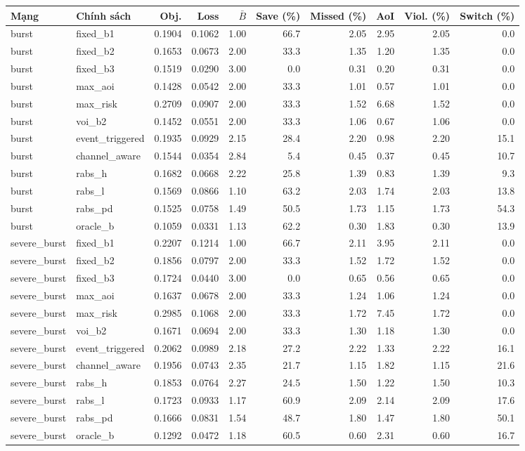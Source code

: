 \begin{tabular}{llrrrrrrrr}
\toprule
Mạng & Chính sách & Obj. & Loss & $\bar{B}$ & Save (\%) & Missed (\%) & AoI & Viol. (\%) & Switch (\%) \\
\midrule
burst & fixed\_b1 & 0.1904 & 0.1062 & 1.00 & 66.7 & 2.05 & 2.95 & 2.05 & 0.0 \\
burst & fixed\_b2 & 0.1653 & 0.0673 & 2.00 & 33.3 & 1.35 & 1.20 & 1.35 & 0.0 \\
burst & fixed\_b3 & 0.1519 & 0.0290 & 3.00 & 0.0 & 0.31 & 0.20 & 0.31 & 0.0 \\
burst & max\_aoi & 0.1428 & 0.0542 & 2.00 & 33.3 & 1.01 & 0.57 & 1.01 & 0.0 \\
burst & max\_risk & 0.2709 & 0.0907 & 2.00 & 33.3 & 1.52 & 6.68 & 1.52 & 0.0 \\
burst & voi\_b2 & 0.1452 & 0.0551 & 2.00 & 33.3 & 1.06 & 0.67 & 1.06 & 0.0 \\
burst & event\_triggered & 0.1935 & 0.0929 & 2.15 & 28.4 & 2.20 & 0.98 & 2.20 & 15.1 \\
burst & channel\_aware & 0.1544 & 0.0354 & 2.84 & 5.4 & 0.45 & 0.37 & 0.45 & 10.7 \\
burst & rabs\_h & 0.1682 & 0.0668 & 2.22 & 25.8 & 1.39 & 0.83 & 1.39 & 9.3 \\
burst & rabs\_l & 0.1569 & 0.0866 & 1.10 & 63.2 & 2.03 & 1.74 & 2.03 & 13.8 \\
burst & rabs\_pd & 0.1525 & 0.0758 & 1.49 & 50.5 & 1.73 & 1.15 & 1.73 & 54.3 \\
burst & oracle\_b & 0.1059 & 0.0331 & 1.13 & 62.2 & 0.30 & 1.83 & 0.30 & 13.9 \\
severe\_burst & fixed\_b1 & 0.2207 & 0.1214 & 1.00 & 66.7 & 2.11 & 3.95 & 2.11 & 0.0 \\
severe\_burst & fixed\_b2 & 0.1856 & 0.0797 & 2.00 & 33.3 & 1.52 & 1.72 & 1.52 & 0.0 \\
severe\_burst & fixed\_b3 & 0.1724 & 0.0440 & 3.00 & 0.0 & 0.65 & 0.56 & 0.65 & 0.0 \\
severe\_burst & max\_aoi & 0.1637 & 0.0678 & 2.00 & 33.3 & 1.24 & 1.06 & 1.24 & 0.0 \\
severe\_burst & max\_risk & 0.2985 & 0.1068 & 2.00 & 33.3 & 1.72 & 7.45 & 1.72 & 0.0 \\
severe\_burst & voi\_b2 & 0.1671 & 0.0694 & 2.00 & 33.3 & 1.30 & 1.18 & 1.30 & 0.0 \\
severe\_burst & event\_triggered & 0.2062 & 0.0989 & 2.18 & 27.2 & 2.22 & 1.33 & 2.22 & 16.1 \\
severe\_burst & channel\_aware & 0.1956 & 0.0743 & 2.35 & 21.7 & 1.15 & 1.82 & 1.15 & 21.6 \\
severe\_burst & rabs\_h & 0.1853 & 0.0764 & 2.27 & 24.5 & 1.50 & 1.22 & 1.50 & 10.3 \\
severe\_burst & rabs\_l & 0.1723 & 0.0933 & 1.17 & 60.9 & 2.09 & 2.14 & 2.09 & 17.6 \\
severe\_burst & rabs\_pd & 0.1666 & 0.0831 & 1.54 & 48.7 & 1.80 & 1.47 & 1.80 & 50.1 \\
severe\_burst & oracle\_b & 0.1292 & 0.0472 & 1.18 & 60.5 & 0.60 & 2.31 & 0.60 & 16.7 \\
\bottomrule
\end{tabular}
